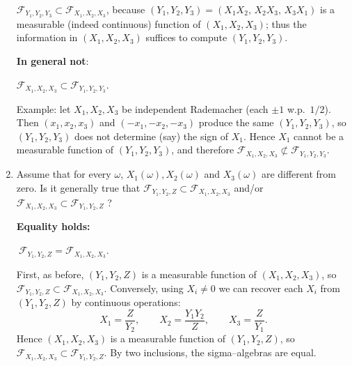 \documentclass[dvipsnames,11pt]{article}
\begin{document}
\begin{enumerate}[label=\alph*.]
\begin{solution}
                $\mathcal F_{Y_1,Y_2,Y_3}\subset \mathcal F_{X_1,X_2,X_3}$, because
                $(Y_1,Y_2,Y_3)=(X_1X_2,\,X_2X_3,\,X_3X_1)$ is a measurable (indeed continuous) function of $(X_1,X_2,X_3)$; thus the information in $(X_1,X_2,X_3)$ suffices to compute $(Y_1,Y_2,Y_3)$.
                
                \textbf{In general not}:
                
                $\mathcal F_{X_1,X_2,X_3}\subset \mathcal F_{Y_1,Y_2,Y_3}$.  
                
                Example: let $X_1,X_2,X_3$ be independent Rademacher (each $\pm1$ w.p.\ $1/2$). Then $(x_1,x_2,x_3)$ and $(-x_1,-x_2,-x_3)$ produce the same $(Y_1,Y_2,Y_3)$, so $(Y_1,Y_2,Y_3)$ does not determine (say) the sign of $X_1$. Hence $X_1$ cannot be a measurable function of $(Y_1,Y_2,Y_3)$, and therefore $\mathcal F_{X_1,X_2,X_3}\not\subset \mathcal F_{Y_1,Y_2,Y_3}$.
                
            \end{solution}
            
        \item Assume that for every $\omega$, $X_1(\omega),X_2(\omega)$ and $X_3(\omega)$ are different from zero. Is it generally true that $\mathcal F_{Y_1,Y_2,Z}\subset \mathcal F_{X_1,X_2,X_3}$ and/or $\mathcal F_{X_1,X_2,X_3}\subset \mathcal F_{Y_1,Y_2,Z}$ ?
    
            \begin{solution}
    
                \textbf{Equality holds:} 
                
                $\ \mathcal F_{Y_1,Y_2,Z}=\mathcal F_{X_1,X_2,X_3}$.

                First, as before, $(Y_1,Y_2,Z)$ is a measurable function of $(X_1,X_2,X_3)$, so 
                $\mathcal F_{Y_1,Y_2,Z}\subset \mathcal F_{X_1,X_2,X_3}$.  
                Conversely, using $X_i\neq 0$ we can recover each $X_i$ from $(Y_1,Y_2,Z)$ by continuous operations:
                \[
                X_1=\frac{Z}{Y_2},\qquad 
                X_2=\frac{Y_1Y_2}{Z},\qquad
                X_3=\frac{Z}{Y_1}.
                \]
                Hence $(X_1,X_2,X_3)$ is a measurable function of $(Y_1,Y_2,Z)$, so $\mathcal F_{X_1,X_2,X_3} \subset \mathcal F_{Y_1,Y_2,Z}$. By two inclusions, the sigma–algebras are equal.
                
            \end{solution}
            

\end{enumerate}
\end{document}
